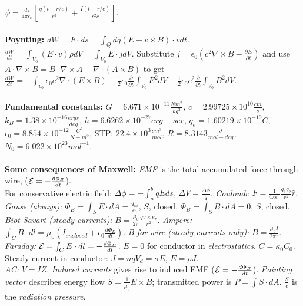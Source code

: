 $\psi = {\frac {dz} {4 \pi \epsilon_0}} [{\frac {q(t-r/c)} {r^3}} + {\frac {I(t-r/c)} {r^2c}}]$.
\\
\\
{\bf Poynting:} $dW = F \cdot ds = \int_{Q} dq (E + v \times B) \cdot v dt$.
${\frac {dW} {dt}} = \int_{V_0} (E \cdot v) \rho dV = \int_{V_0} E \cdot j dV$.
Substitute $j = \epsilon_0 (c^2 \nabla \times B - {\frac {\partial E} {\partial t}})$ and use
$A \cdot \nabla \times B = B \cdot \nabla \times A - \nabla \cdot (A \times B)$ to get
${\frac {dW} {dt}} = - \int_{v_0} \epsilon_0 c^2 \nabla \cdot (E \times B) -
{\frac 1 2} \epsilon_0 {\frac {\partial} {\partial t}} \int_{V_0} E^2 dV
- {\frac 1 2} \epsilon_0 c^2 {\frac {\partial} {\partial t}} \int_{V_0} B^2 dV$.
\\
\\
{\bf Fundamental constants:}
$G= 6.671 \times 10^{-11} {\frac {N m^{2}} {kg^{2}}}$, 
$c= 2.99725 \times 10^{10} {\frac {cm}{s}} $,
$k_B = 1.38 \times 10^{-16} {\frac  {ergs}{deg}}$,
$h= 6.6262 \times 10^{-27} erg-sec$,
$q_{e} = 1.60219 \times 10^{-19} C$,
$\epsilon_{0} = 8.854 \times 10^{-12} {\frac {C^2} {N-m^2}}$,
STP: $22.4 \times 10^{3} {\frac {cm^{3}} {mol}}$,
$R=8.3143 {\frac {J}{mol-deg}}$,
$N_{0} = 6.022 \times 10^{23} mol^{-1}$.
\\
\\
{\bf Some consequences of Maxwell:} 
\emph{EMF} is the total accumulated force through wire,
(${\cal E}= -{\frac {d \phi_B} {dt}}$).\\
For conservative electric field:
$\Delta \phi = - \int_a^b q E ds$, $\Delta V= {\frac {\Delta \phi} q}$.
\emph{Coulomb:} $F= {\frac 1 {4 \pi \epsilon_0}} {\frac {q_1 q_2} {r^2}} {\hat r}$.
\emph{Gauss (always):} $\Phi_E = \int_S E \cdot dA= {\frac {q_{in}} {\epsilon_0}}$,
$S$, closed.  $\Phi_B= \int_S B \cdot dA=0$, $S$, closed.  
\emph{Biot-Savart (steady currents):}
$B= {\frac {\mu_0} {2 \pi}} {\frac {qv \times e_r} {r^2}}$.
\emph{Ampere:} $\int_C B \cdot dl = \mu_0 (I_{enclosed}+\epsilon_0 {\frac {d \Phi_E}{dt}})$.
\emph{B for wire (steady currents only):} $B= {\frac {\mu_0 I} {2 \pi r}}$.  
\emph{Faraday:} ${\cal E}= \int_C E \cdot dl= - {\frac {d \Phi_B} {dt}}$.
$E= 0$ for conductor in \emph{electrostatics}.
$C=\kappa_0 C_0$.  Steady current in conductor: $J= nqV_d= \sigma E$, $E=\rho J$.\\
\emph{AC:} $V=IZ$. \emph{Induced currents} gives rise to induced 
EMF (${\cal E}= -{\frac {d \Phi_B} {dt}}$).
\emph{Pointing vector} describes energy flow 
$S= {\frac 1 {\mu_0}} E \times B$; transmitted power
is $P= \int S \cdot dA$.  ${\frac S c}$ is the \emph{radiation pressure}.  

